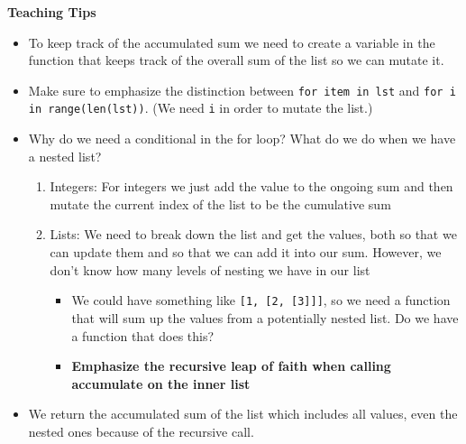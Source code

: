 \begin{blocksection}
\begin{guide}
\textbf{Teaching Tips}

\begin{itemize}
\item To keep track of the accumulated sum we need to create a variable in the function that keeps track of the overall sum of the list so we can mutate it.
\item Make sure to emphasize the distinction between \lstinline{for item in lst} and \lstinline{for i in range(len(lst))}. (We need \lstinline{i} in order to mutate the list.)
\item Why do we need a conditional in the for loop? What do we do when we have a nested list?
\begin{enumerate}
\item Integers:  For integers we just add the value to the ongoing sum and then mutate the current index of the list to be the cumulative sum
\item Lists: We need to break down the list and get the values, both so that we can update them and so that we can add it into our sum.  However, we don’t know how many levels of nesting we have in our list
\begin{itemize} 
\item We could have something like \lstinline{[1, [2, [3]]]}, so we need a function that will sum up the 
values from a potentially nested list.  Do we have a function that does this?
\item \textbf{Emphasize the recursive leap of faith when calling accumulate on the inner list}
\end{itemize}
\end{enumerate}
\item We return the accumulated sum of the list which includes all values, even the nested ones because of the recursive call. 
\end{itemize}
\end{guide}
\end{blocksection}

